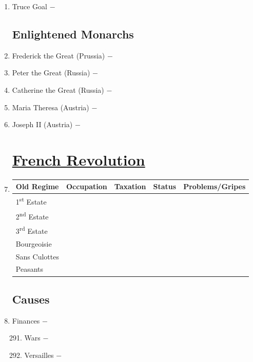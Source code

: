 \documentclass[12pt]{article}
\begin{document}
\begin{enumerate}
\item Truce Goal $-$

\subsection{Enlightened Monarchs}

\item Frederick the Great (Prussia) $-$ 

\item Peter the Great (Russia) $-$

\item Catherine the Great (Russia) $-$ 

\item Maria Theresa (Austria) $-$ 

\item Joseph II (Austria) $-$


\section{\underline{French Revolution}} 

\item \begin{tabular}{l c c c c}

Old Regime & Occupation & Taxation & Status & Problems/Gripes\\
\hline
1\textsuperscript{st} Estate & & & & \\
\hline
2\textsuperscript{nd} Estate & & & & \\
\hline
3\textsuperscript{rd} Estate & & & & \\
\hline
Bourgeoisie & & & & \\
\hline
Sans Culottes & & & & \\
\hline
Peasants & & & & \\
\hline

\end{tabular}

\subsection{Causes}

\item Finances $-$

\begin{enumerate}[label=\arabic{*}.]
\setcounter{enumii}{290}

\item Wars $-$

\item Versailles $-$


\end{enumerate}
\end{enumerate}
\end{document}
